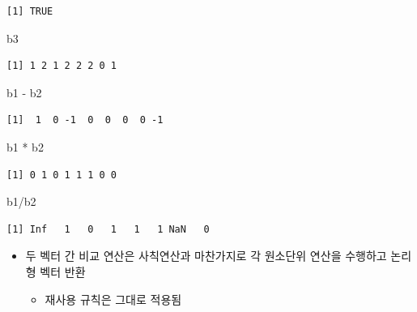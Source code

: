 \documentclass[
  11pt,
]{krantz}
\newenvironment{Shaded}{\begin{snugshade}}{\end{snugshade}}
\newcommand{\NormalTok}[1]{#1}
\newcommand{\SpecialCharTok}[1]{\textcolor[rgb]{0,0,0}{#1}}
\providecommand{\tightlist}{%
  \setlength{\itemsep}{0pt}\setlength{\parskip}{0pt}}
\begin{document}
\begin{verbatim}
[1] TRUE
\end{verbatim}

\begin{Shaded}
\begin{Highlighting}[]
\NormalTok{b3}
\end{Highlighting}
\end{Shaded}

\begin{verbatim}
[1] 1 2 1 2 2 2 0 1
\end{verbatim}

\begin{Shaded}
\begin{Highlighting}[]
\NormalTok{b1 }\SpecialCharTok{{-}}\NormalTok{ b2}
\end{Highlighting}
\end{Shaded}

\begin{verbatim}
[1]  1  0 -1  0  0  0  0 -1
\end{verbatim}

\begin{Shaded}
\begin{Highlighting}[]
\NormalTok{b1 }\SpecialCharTok{*}\NormalTok{ b2}
\end{Highlighting}
\end{Shaded}

\begin{verbatim}
[1] 0 1 0 1 1 1 0 0
\end{verbatim}

\begin{Shaded}
\begin{Highlighting}[]
\NormalTok{b1}\SpecialCharTok{/}\NormalTok{b2}
\end{Highlighting}
\end{Shaded}

\begin{verbatim}
[1] Inf   1   0   1   1   1 NaN   0
\end{verbatim}

\normalsize

\begin{itemize}
\tightlist
\item
  두 벡터 간 비교 연산은 사칙연산과 마찬가지로 각 원소단위 연산을 수행하고 논리형 벡터 반환

  \begin{itemize}
  \tightlist
  \item
    재사용 규칙은 그대로 적용됨
  \end{itemize}
\end{itemize}
\end{document}

